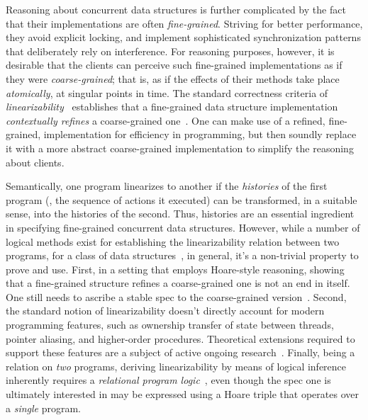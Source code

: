 Reasoning about concurrent data structures is further complicated by
the fact that their implementations are often \emph{fine-grained}.
Striving for better performance, they avoid explicit locking, and
implement sophisticated synchronization patterns that deliberately
rely on interference.
% 
For reasoning purposes, however, it is desirable that the clients can
perceive such fine-grained implementations as if they were
\emph{coarse-grained}; that is, as if the effects of their methods
take place \emph{atomically}, at singular points in time.  The
standard correctness criteria of
\emph{linearizability}~\cite{Herlihy-WingTOPLAS90} establishes that a
fine-grained data structure implementation \emph{contextually refines}
a coarse-grained one~\cite{Filipovic-al:TCS10}. One can make use of a
refined, fine-grained, implementation for efficiency in programming,
but then soundly replace it with a more abstract coarse-grained
implementation to simplify the reasoning about clients.


Semantically, one program linearizes to another if the
\emph{histories} of the first program (\ie, the sequence of actions it
executed) can be transformed, in a suitable sense, into the histories
of the second. Thus, histories are an essential ingredient in
specifying fine-grained concurrent data structures. However, while a
number of logical methods exist for establishing the linearizability
relation between two programs, for a class of data
structures~\cite{OHearn-al:PODC10,Elmas-al:TACAS10,Vafeiadis:PhD,Liang-Feng:PLDI13},
in general, it's a non-trivial property to prove and use. First, in a
setting that employs Hoare-style reasoning, showing that a
fine-grained structure refines a coarse-grained one is not an end in
itself. One still needs to ascribe a stable spec to the coarse-grained
version~\cite{Turon-al:ICFP13,Liang-Feng:PLDI13}.
%
Second, the standard notion of linearizability doesn't directly
account for modern programming features, such as ownership transfer of
state between threads, pointer aliasing, and higher-order
procedures. Theoretical extensions required to support these features
are a subject of active ongoing
research~\cite{Cerone-al:ICALP14,Gotsman-Yang:CONCUR12}.
%
Finally, being a relation on \emph{two} programs, deriving
linearizability by means of logical inference inherently requires a
\emph{relational program
  logic}~\cite{Turon-al:ICFP13,Liang-Feng:PLDI13}, even though the
spec one is ultimately interested in 
may be expressed using a Hoare triple that operates over a
\emph{single} program.

